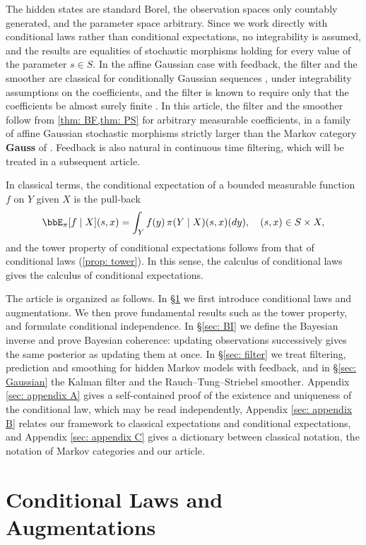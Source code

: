\documentclass[12pt,reqno]{amsart}%
\theoremstyle{plain}
\theoremstyle{definition}
\begin{document}
The hidden states are standard Borel, the observation spaces only countably generated, and the parameter space arbitrary.
Since we work directly with conditional laws rather than conditional expectations,
no integrability is assumed, and the results are equalities of stochastic morphisms
holding for every value of the parameter $s\in S$.
In the affine Gaussian case with feedback, the filter and the smoother are classical
for conditionally Gaussian sequences \cite[Chapter~13]{LS01}, under integrability assumptions on the coefficients, and the filter is known to require only that the coefficients be almost surely finite \cite{CKvS89}.
In this article, the filter and the smoother follow from \cref{thm: BF,thm: PS} for arbitrary measurable coefficients, in a family of affine Gaussian stochastic morphisms strictly larger than the Markov category \textbf{Gauss} of \cite[\S6]{F20}.
Feedback is also natural in continuous time filtering, which will be treated in a subsequent article.

In classical terms, the conditional expectation of a bounded measurable function $f$ on $Y$ given $X$
is the pull-back
\[
	\bbE_\pi[f\mid X](s,x)=\int_Yf(y)\,\pi(Y\mid X)(s,x)(dy),\quad (s,x)\in S\times X,
\]
and the tower property of conditional expectations follows from that of conditional laws (\cref{prop: tower}).
In this sense, the calculus of conditional laws gives the calculus of conditional expectations.

The article is organized as follows.
In \S\ref{sec: CL} we first introduce conditional laws and augmentations.
We then prove fundamental results
such as the tower property,
and formulate conditional independence.
In \S\ref{sec: BI} we define the Bayesian inverse and prove Bayesian coherence:
updating observations successively gives the same posterior as updating them at once.
In \S\ref{sec: filter} we treat filtering, prediction and smoothing for hidden Markov models with feedback,
and in \S\ref{sec: Gaussian} the Kalman filter and the Rauch--Tung--Striebel smoother.
Appendix \ref{sec: appendix A} gives a self-contained proof of the existence and uniqueness of the conditional law,
which may be read independently,
Appendix \ref{sec: appendix B} relates our framework to classical expectations and conditional expectations,
and Appendix \ref{sec: appendix C} gives a dictionary between classical notation, the notation of Markov categories and our article.

%
%
%
\section{Conditional Laws and Augmentations}\label{sec: CL}
%
%
%
\end{document}
